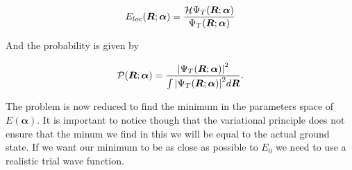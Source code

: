 \begin{equation}
  E_{loc}(\bm{R};\bm{\alpha})=\dfrac{\mathcal{H}\Psi_T(\bm{R};\bm{\alpha})}{\Psi_T(\bm{R};\bm{\alpha})}
  \label{Eloc}
\end{equation}

And the probability is given by

\begin{equation}
  \mathcal{P}(\bm{R};\bm{\alpha})=\dfrac{{| \Psi_T(\bm{R};\bm{\alpha}) |}^2}{\int {| \Psi_T(\bm{R};{\bm{\alpha}}) |}^2d\bm{R}}.
  \label{Qprob}
\end{equation}

The problem is now reduced to find the minimum in the parameters space of $E(\bm{\alpha})$.
It is important to notice though that the variational principle does not ensure that the minum we find in this we will be equal to the actual ground state.
If we want our minimum to be as close as possible to $E_0$ we need to use a realistic trial wave function.
